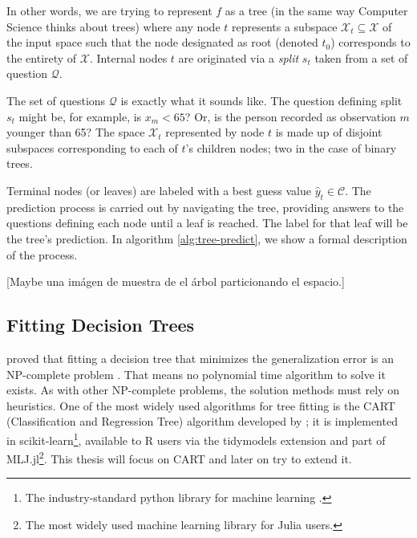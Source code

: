 In other words, we are trying to represent $f$ as a tree (in the same way
Computer Science thinks about trees) where any node $t$ represents a subspace
$\mathcal{X}_t \subseteq \mathcal{X}$ of the input space such that the node
designated as root (denoted $t_0$) corresponds to the entirety of $\mathcal{X}$.
Internal nodes $t$ are originated via a \textit{split} $s_t$ taken from a set of
question $\mathcal{Q}$.

The set of questions $\mathcal{Q}$ is exactly what it sounds like. The question
defining split $s_t$ might be, for example, is $x_m < 65$? Or, is the person
recorded as observation $m$ younger than 65? The space $\mathcal{X}_t$
represented by node $t$ is made up of disjoint subspaces corresponding to each
of $t$'s children nodes; two in the case of binary trees. 

Terminal nodes (or leaves) are labeled with a best guess value $\widehat{y}_t
\in \mathcal{C}$. The prediction process is carried out by navigating the tree,
providing answers to the questions defining each node until a leaf is reached.
The label for that leaf will be the tree's prediction. In algorithm
\ref{alg:tree-predict}, we show a formal description of the process.

\begin{algorithm}
    \caption[Tree prediction algorithm]{Predict output value $\widehat{y}$ with
        tree $f_\L$ \cite[Ch.~3.2]{louppe2014}.}
    \label{alg:tree-predict}
\end{algorithm}

[Maybe una imágen de muestra de el árbol particionando el espacio.]

\subsection{Fitting Decision Trees}
\citeauthor{hyafil1976} proved that fitting a decision tree that minimizes the
generalization error is an NP-complete problem \cite{hyafil1976}. That means no
polynomial time algorithm to solve it exists. As with other NP-complete
problems, the solution methods must rely on heuristics. One of the most widely
used algorithms for tree fitting is the CART (Classification and Regression
Tree) algorithm developed by \citeauthor{breiman2017} \cite{breiman2017}; it is
implemented in scikit-learn\footnote{The industry-standard python library for
machine learning \cite{louppe2014}.}, available to R users via the tidymodels
extension and part of MLJ.jl\footnote{The most widely used machine learning
library for Julia users.}. This thesis will focus on CART and later on try to
extend it.

